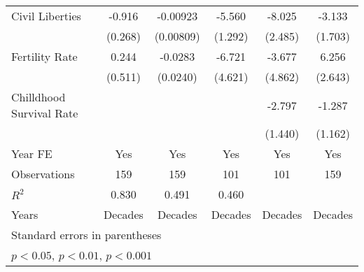 \begin{table}[htbp]
\begin{tabular}{l*{5}{c}}
\addlinespace
Civil Liberties &   -0.916\sym{**} & -0.00923         &   -5.560\sym{***}&   -8.025\sym{**} &   -3.133         \\
                &  (0.268)         &(0.00809)         &  (1.292)         &  (2.485)         &  (1.703)         \\
\addlinespace
Fertility Rate  &    0.244         &  -0.0283         &   -6.721         &   -3.677         &    6.256\sym{*}  \\
                &  (0.511)         & (0.0240)         &  (4.621)         &  (4.862)         &  (2.643)         \\
\addlinespace
Chilldhood Survival Rate&                  &                  &                  &   -2.797         &   -1.287         \\
                &                  &                  &                  &  (1.440)         &  (1.162)         \\
\addlinespace
Year FE         &      Yes         &      Yes         &      Yes         &      Yes         &      Yes         \\
\midrule
Observations    &      159         &      159         &      101         &      101         &      159         \\
\(R^{2}\)       &    0.830         &    0.491         &    0.460         &                  &                  \\
Years           &  Decades         &  Decades         &  Decades         &  Decades         &  Decades         \\
\bottomrule
\multicolumn{6}{l}{\footnotesize Standard errors in parentheses}\\
\multicolumn{6}{l}{\footnotesize \sym{*} \(p<0.05\), \sym{**} \(p<0.01\), \sym{***} \(p<0.001\)}\\
\end{tabular}
\end{table}
